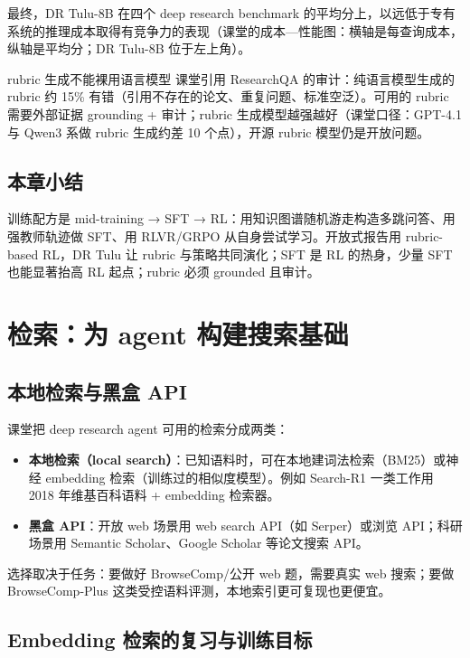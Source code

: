 \documentclass[a4paper]{article}
\begin{document}
最终，DR Tulu-8B 在四个 deep research benchmark 的平均分上，以远低于专有系统的推理成本取得有竞争力的表现（课堂的成本—性能图：横轴是每查询成本，纵轴是平均分；DR Tulu-8B 位于左上角）。

\begin{warningbox}{rubric 生成不能裸用语言模型}
课堂引用 ResearchQA 的审计：纯语言模型生成的 rubric 约 15\% 有错（引用不存在的论文、重复问题、标准空泛）。可用的 rubric 需要外部证据 grounding + 审计；rubric 生成模型越强越好（课堂口径：GPT-4.1 与 Qwen3 系做 rubric 生成约差 10 个点），开源 rubric 模型仍是开放问题。
\end{warningbox}

\subsection{本章小结}
训练配方是 mid-training → SFT → RL：用知识图谱随机游走构造多跳问答、用强教师轨迹做 SFT、用 RLVR/GRPO 从自身尝试学习。开放式报告用 rubric-based RL，DR Tulu 让 rubric 与策略共同演化；SFT 是 RL 的热身，少量 SFT 也能显著抬高 RL 起点；rubric 必须 grounded 且审计。

\section{检索：为 agent 构建搜索基础}

\subsection{本地检索与黑盒 API}

课堂把 deep research agent 可用的检索分成两类：

\begin{itemize}
\item \textbf{本地检索（local search）}：已知语料时，可在本地建词法检索（BM25）或神经 embedding 检索（训练过的相似度模型）。例如 Search-R1 一类工作用 2018 年维基百科语料 + embedding 检索器。
\item \textbf{黑盒 API}：开放 web 场景用 web search API（如 Serper）或浏览 API；科研场景用 Semantic Scholar、Google Scholar 等论文搜索 API。
\end{itemize}

选择取决于任务：要做好 BrowseComp/公开 web 题，需要真实 web 搜索；要做 BrowseComp-Plus 这类受控语料评测，本地索引更可复现也更便宜。

\subsection{Embedding 检索的复习与训练目标}
\end{document}
